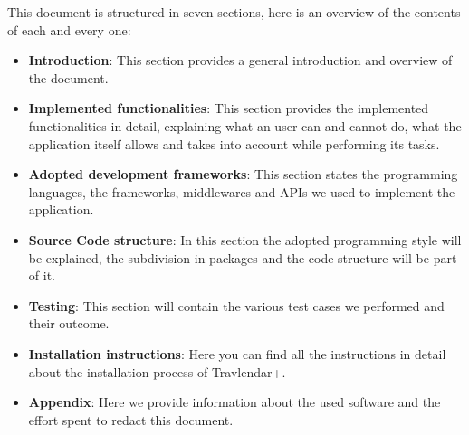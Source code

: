 This document is structured in seven sections, here is an overview of the contents of each and every one:
\begin{itemize}
	\item \textbf{Introduction}: 
This section provides a general introduction and overview of the document.
	\item \textbf{Implemented functionalities}:
This section provides the implemented functionalities in detail, explaining what an user can and cannot do, what the application itself allows and takes into account while performing its tasks.
	\item \textbf{Adopted development frameworks}: 
This section states the programming languages, the frameworks, middlewares and APIs we used to implement the application.
	\item \textbf{Source Code structure}: 
	In this section the adopted programming style will be explained, the subdivision in packages and the code structure will be part of it.
	\item \textbf{Testing}: 
	This section will contain the various test cases we performed and their outcome.
	\item \textbf{Installation instructions}: 
Here you can find all the instructions in detail about the installation process of Travlendar+.
\item \textbf{Appendix}: 
Here we provide information about the used software and the effort spent to redact this document. 
\end{itemize}